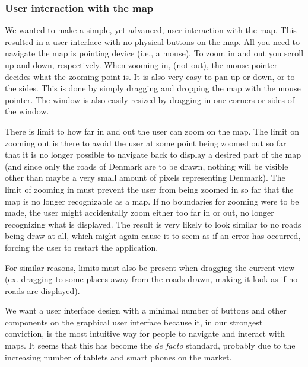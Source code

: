\subsubsection{User interaction with the map}
We wanted to make a simple, yet advanced, user interaction with the map. This resulted in a user interface with no physical buttons on the map. All you need to navigate the map is pointing device (i.e., a mouse). To zoom in and out you scroll up and down, respectively. When zooming in, (not out), the mouse pointer decides what the zooming point is. It is also very easy to pan up or down, or to the sides. This is done by simply dragging and dropping the map with the mouse pointer. The window is also easily resized by dragging in one corners or sides of the window.

There is limit to how far in and out the user can zoom on the map. The limit on zooming out is there to avoid the user at some point being zoomed out so far that it is no longer possible to navigate back to display a desired part of the map (and since only the roads of Denmark are to be drawn, nothing will be visible other than maybe a very small amount of pixels representing Denmark). The limit of zooming in must prevent the user from being zoomed in so far that the map is no longer recognizable as a map. If no boundaries for zooming were to be made, the user might accidentally zoom either too far in or out, no longer recognizing what is displayed. The result is very likely to look similar to no roads being draw at all, which might again cause it to seem as if an error has occurred, forcing the user to restart the application.

For similar reasons, limits must also be present when dragging the current view (ex. dragging to some places away from the roads drawn, making it look as if no roads are displayed).

We want a user interface design with a minimal number of buttons and other components on the graphical user interface because it, in our strongest conviction, is the most intuitive way for people to navigate and interact with maps. It seems that this has become the \textit{de facto} standard, probably due to the increasing number of tablets and smart phones on the market.

